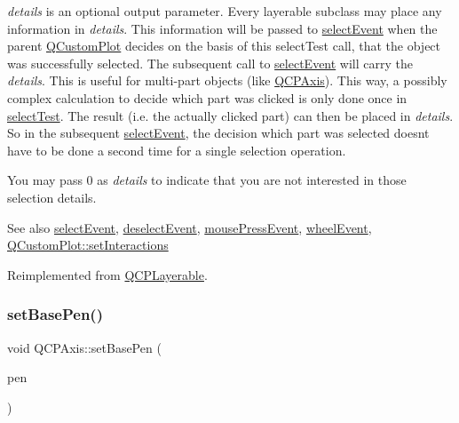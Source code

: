 {\itshape details} is an optional output parameter. Every layerable subclass may place any information in {\itshape details}. This information will be passed to \hyperlink{class_q_c_p_axis_a50c3ed18e189d48421ec2978f88e4f87}{select\+Event} when the parent \hyperlink{class_q_custom_plot}{Q\+Custom\+Plot} decides on the basis of this select\+Test call, that the object was successfully selected. The subsequent call to \hyperlink{class_q_c_p_axis_a50c3ed18e189d48421ec2978f88e4f87}{select\+Event} will carry the {\itshape details}. This is useful for multi-\/part objects (like \hyperlink{class_q_c_p_axis}{Q\+C\+P\+Axis}). This way, a possibly complex calculation to decide which part was clicked is only done once in \hyperlink{class_q_c_p_axis_a63b7103c57fe9acfbce164334ea837f8}{select\+Test}. The result (i.\+e. the actually clicked part) can then be placed in {\itshape details}. So in the subsequent \hyperlink{class_q_c_p_axis_a50c3ed18e189d48421ec2978f88e4f87}{select\+Event}, the decision which part was selected doesn\textquotesingle{}t have to be done a second time for a single selection operation.

You may pass 0 as {\itshape details} to indicate that you are not interested in those selection details.

\begin{DoxySeeAlso}{See also}
\hyperlink{class_q_c_p_axis_a50c3ed18e189d48421ec2978f88e4f87}{select\+Event}, \hyperlink{class_q_c_p_axis_a5bc1f8a8d0fbc7658eba70c80279ed31}{deselect\+Event}, \hyperlink{class_q_c_p_axis_ac89c068873ee9197a5d2af715bdc1105}{mouse\+Press\+Event}, \hyperlink{class_q_c_p_axis_a71643d27524a843230b5ba68085b3d9b}{wheel\+Event}, \hyperlink{class_q_custom_plot_a5ee1e2f6ae27419deca53e75907c27e5}{Q\+Custom\+Plot\+::set\+Interactions} 
\end{DoxySeeAlso}


Reimplemented from \hyperlink{class_q_c_p_layerable_a04db8351fefd44cfdb77958e75c6288e}{Q\+C\+P\+Layerable}.

\mbox{\label{class_q_c_p_axis_a778d45fb71b3c7ab3bb7079e18b058e4}} 
\subsubsection{\texorpdfstring{set\+Base\+Pen()}{setBasePen()}}
{\footnotesize\ttfamily void Q\+C\+P\+Axis\+::set\+Base\+Pen (\begin{DoxyParamCaption}\item[{const Q\+Pen \&}]{pen }\end{DoxyParamCaption})}

